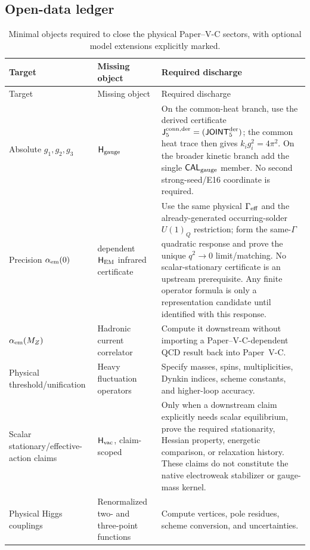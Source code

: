 \documentclass[11pt,a4paper]{article}
\newcommand{\Hem}{\mathsf{H}_{\rm EM}}
\newcommand{\Hvac}{\mathsf{H}_{\rm vac}}
\newcommand{\Hgauge}{\mathsf{H}_{\rm gauge}}
\newcommand{\Rconn}{\mathsf J_5^{\rm conn,der}}
\newcommand{\JOINTfiveocc}{\mathsf{JOINT}_{5}^{\rm der}}
\newcommand{\CALgauge}{\mathsf{CAL}_{\rm gauge}}
\begin{document}
\subsection{Open-data ledger}
\label{p7v2:sec:open-ledger}

\begin{longtable}{@{}L{0.22\textwidth}L{0.31\textwidth}L{0.39\textwidth}@{}}
\caption[Premise-minimized open-data ledger]{Minimal objects required to close
the physical Paper--V-C sectors, with optional model extensions explicitly
marked.}\label{p7v2:tab:open-obligations}\\
\toprule
Target & Missing object & Required discharge\\
\midrule
\endfirsthead
\toprule
Target & Missing object & Required discharge\\
\midrule
\endhead
Absolute \(g_1,g_2,g_3\)
& \(\Hgauge\)
& On the common-heat branch, use the derived certificate
\(\Rconn=(\JOINTfiveocc)\); the common heat trace then gives
\(k_i g_i^2=4\pi^2\).  On the broader kinetic branch add the single
\(\CALgauge\) member.  No second strong-seed/E16 coordinate is required.\\
Precision \(\alpha_{\rm em}(0)\)
& dependent \(\Hem\) infrared certificate
& Use the same physical \(\Gamma_{\rm eff}\) and the already-generated occurring-solder
\(U(1)_Q\) restriction; form the same-\(\Gamma\) quadratic response and prove the
unique \(q^2\to0\) limit/matching.  No scalar-stationary certificate is an
upstream prerequisite.  Any finite operator formula is only a representation
candidate until identified with this response.\\
\(\alpha_{\rm em}(M_Z)\)
& Hadronic current correlator
& Compute it downstream without importing a Paper--V-C-dependent QCD result
back into Paper~V-C.\\
Physical threshold/unification
& Heavy fluctuation operators
& Specify masses, spins, multiplicities, Dynkin indices, scheme constants, and
higher-loop accuracy.\\
Scalar stationary/effective-action claims
& \(\Hvac\), claim-scoped
& Only when a downstream claim explicitly needs scalar equilibrium, prove the
required stationarity, Hessian property, energetic comparison, or relaxation
history.  These claims do not constitute the native electroweak stabilizer or
gauge-mass kernel.\\
Physical Higgs couplings
& Renormalized two- and three-point functions
& Compute vertices, pole residues, scheme conversion, and uncertainties.\\

\end{longtable}
\end{document}

